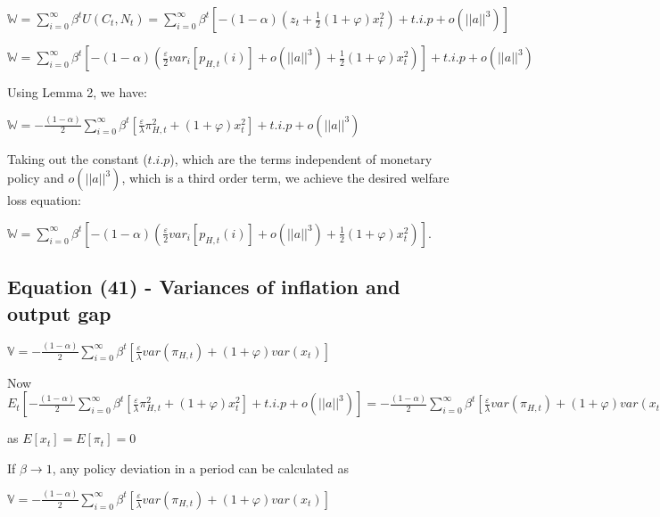\documentclass[
]{article}
\begin{document}
\(\displaystyle \mathbb{W}= \sum_{i=0}^{\infty} \beta^tU(C_t,N_t) = \sum_{i=0}^{\infty} \beta^t \left[-(1-\alpha)\left( z_t + \frac{1}{2}(1+\varphi)x_t^2 \right) + t.i.p+ o(||a||^3) \right]\)

\(\displaystyle \mathbb{W}= \sum_{i=0}^{\infty} \beta^t \left[-(1-\alpha)\left( \frac{\varepsilon}{2}var_i[p_{H,t}(i)] +o(||a||^3) + \frac{1}{2}(1+\varphi)x_t^2 \right) \right]+ t.i.p+ o(||a||^3)\)

Using Lemma 2, we have:

\(\displaystyle \mathbb{W}= -\frac{(1-\alpha)}{2}\sum_{i=0}^{\infty} \beta^t \left[ \frac{\varepsilon}{\lambda}\pi_{H,t}^2+ (1+\varphi)x_t^2 \right] + t.i.p + o(||a||^3)\)

Taking out the constant (\(t.i.p\)), which are the terms independent of
monetary policy and \(o(||a||^3)\), which is a third order term, we
achieve the desired welfare loss equation:

\(\displaystyle \mathbb{W}= \sum_{i=0}^{\infty} \beta^t \left[-(1-\alpha)\left( \frac{\varepsilon}{2}var_i[p_{H,t}(i)] +o(||a||^3) + \frac{1}{2}(1+\varphi)x_t^2 \right) \right]\).

\vspace{12pt}

\hypertarget{equation-41---variances-of-inflation-and-output-gap}{%
\subsection{Equation (41) - Variances of inflation and output
gap}\label{equation-41---variances-of-inflation-and-output-gap}}

\(\displaystyle \mathbb{V} = -\frac{(1-\alpha)}{2}\sum_{i=0}^{\infty} \beta^t \left[ \frac{\varepsilon}{\lambda}var(\pi_{H,t})+ (1+\varphi)var(x_t) \right]\)

\vspace{8pt}

Now
\(\displaystyle E_t \left[ -\frac{(1-\alpha)}{2}\sum_{i=0}^{\infty} \beta^t \left[ \frac{\varepsilon}{\lambda}\pi_{H,t}^2+ (1+\varphi)x_t^2 \right] + t.i.p+ o(||a||^3) \right] = -\frac{(1-\alpha)}{2}\sum_{i=0}^{\infty} \beta^t \left[ \frac{\varepsilon}{\lambda}var(\pi_{H,t})+ (1+\varphi)var(x_t) \right]\)

as \(E[x_t]=E[\pi_t]=0\)

If \(\beta \to 1\), any policy deviation in a period can be calculated
as

\(\displaystyle \mathbb{V} = -\frac{(1-\alpha)}{2}\sum_{i=0}^{\infty} \beta^t \left[ \frac{\varepsilon}{\lambda}var(\pi_{H,t})+ (1+\varphi)var(x_t) \right]\)
\end{document}
